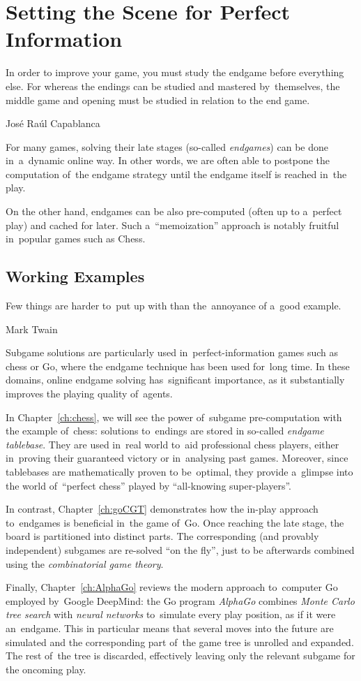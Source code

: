 \chapter{Setting the Scene for Perfect Information}
\epigraph{
  In order to improve your game, you must study the endgame before everything else.
  For whereas the endings can be studied and mastered by~themselves, the middle game and opening must be studied in relation to the end game.
}{José Raúl Capablanca}

For many games, solving their late stages (so-called \emph{endgames}) can be done in~a~dynamic online way.
In other words, we are often able to postpone the computation of~the endgame strategy until the endgame itself is reached in~the play.

On the other hand, endgames can be also pre-computed (often up to a~perfect play) and cached for later.
Such a~``memoization'' approach is notably fruitful in~popular games such as Chess.

\section{Working Examples}
\epigraph{
  Few things are harder to~put up with than the~annoyance of a~good example.
}{Mark Twain}
Subgame solutions are particularly used in~perfect-information games such as chess or Go, where the endgame technique has been used for~long time.
In these domains, online endgame solving has~significant importance, as it substantially improves the playing quality of~agents.

In Chapter~\ref{ch:chess}, we will see the power of~subgame pre-computation with the example of~chess:
solutions to~endings are stored in so-called \emph{endgame tablebase}.
They are used in~real world to~aid professional chess players, either in~proving their guaranteed victory or in~analysing past games.
Moreover, since tablebases are mathematically proven to be~optimal, they provide a~glimpse into the world of~``perfect chess'' played by ``all-knowing super-players''.

In contrast, Chapter~\ref{ch:goCGT} demonstrates how the in-play approach to~endgames is beneficial in~the game of~Go.
Once reaching the late stage, the board is partitioned into distinct parts.
The corresponding (and provably independent) subgames are re-solved ``on the fly'', just to be afterwards combined using the \emph{combinatorial game theory}.

Finally, Chapter~\ref{ch:AlphaGo} reviews the modern approach to~computer Go employed by~Google DeepMind:
the Go program \emph{AlphaGo} combines \emph{Monte Carlo tree search} with \emph{neural networks} to~simulate every play position, as if it were an~endgame.
This in particular means that several moves into the future are simulated and the corresponding part of~the game tree is unrolled and expanded.
The rest of~the tree is discarded, effectively leaving only the relevant subgame for the oncoming play.
